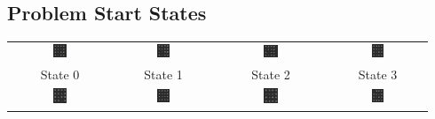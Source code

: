 \documentclass{article}
\begin{document}
	\newpage
	\begin{appendices}
		\section{Problem Start States}
		\label{appendix:start}
		
		\begin{center}
			\begin{tabular}{c c c c}
				\includegraphics[width=0.135\textwidth,keepaspectratio]{State-0.png} & \includegraphics[width=0.135\textwidth,keepaspectratio]{State-1.png} & \includegraphics[width=0.135\textwidth,keepaspectratio]{State-2.png} & \includegraphics[width=0.135\textwidth,keepaspectratio]{State-3.png} \\
				State 0 & State 1 & State 2 & State 3 \\
				\includegraphics[width=0.135\textwidth,keepaspectratio]{State-4.png} & \includegraphics[width=0.135\textwidth,keepaspectratio]{State-5.png} & \includegraphics[width=0.135\textwidth,keepaspectratio]{State-6.png} & \includegraphics[width=0.135\textwidth,keepaspectratio]{State-7.png} \\

\end{tabular}
\end{center}
\end{appendices}
\end{document}
